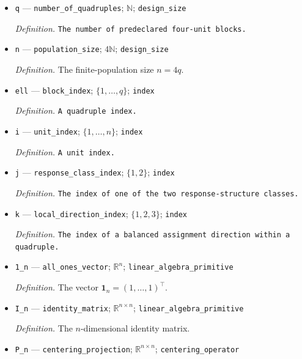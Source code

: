 \documentclass{article}
\begin{document}
\begin{itemize}
  \item \texttt{q} --- \texttt{number\_\allowbreak{}of\_\allowbreak{}quadruples}; \(\mathbb N\); \texttt{design\_\allowbreak{}size}
  \par\smallskip\noindent\emph{Definition.} \texttt{The number of predeclared four-\allowbreak{}unit blocks.}
  \item \texttt{n} --- \texttt{population\_\allowbreak{}size}; \(4\mathbb N\); \texttt{design\_\allowbreak{}size}
  \par\smallskip\noindent\emph{Definition.} The finite-population size \(n=4q\).
  \item \texttt{ell} --- \texttt{block\_\allowbreak{}index}; \(\{1,\ldots,q\}\); \texttt{index}
  \par\smallskip\noindent\emph{Definition.} \texttt{A quadruple index.}
  \item \texttt{i} --- \texttt{unit\_\allowbreak{}index}; \(\{1,\ldots,n\}\); \texttt{index}
  \par\smallskip\noindent\emph{Definition.} \texttt{A unit index.}
  \item \texttt{j} --- \texttt{response\_\allowbreak{}class\_\allowbreak{}index}; \(\{1,2\}\); \texttt{index}
  \par\smallskip\noindent\emph{Definition.} \texttt{The index of one of the two response-\allowbreak{}structure classes.}
  \item \texttt{k} --- \texttt{local\_\allowbreak{}direction\_\allowbreak{}index}; \(\{1,2,3\}\); \texttt{index}
  \par\smallskip\noindent\emph{Definition.} \texttt{The index of a balanced assignment direction within a quadruple.}
  \item \texttt{1\_\allowbreak{}n} --- \texttt{all\_\allowbreak{}ones\_\allowbreak{}vector}; \(\mathbb R^n\); \texttt{linear\_\allowbreak{}algebra\_\allowbreak{}primitive}
  \par\smallskip\noindent\emph{Definition.} The vector \(\mathbf 1_n=(1,\ldots,1)^\top\).
  \item \texttt{I\_\allowbreak{}n} --- \texttt{identity\_\allowbreak{}matrix}; \(\mathbb R^{n\times n}\); \texttt{linear\_\allowbreak{}algebra\_\allowbreak{}primitive}
  \par\smallskip\noindent\emph{Definition.} The \(n\)-dimensional identity matrix.
  \item \texttt{P\_\allowbreak{}n} --- \texttt{centering\_\allowbreak{}projection}; \(\mathbb R^{n\times n}\); \texttt{centering\_\allowbreak{}operator}

\end{itemize}
\end{document}
